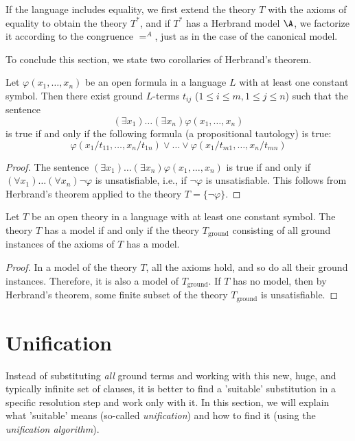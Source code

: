 \begin{remark}
If the language includes equality, we first extend the theory $T$ with the axioms of equality to obtain the theory $T^*$, and if $T^*$ has a Herbrand model $\A$, we factorize it according to the congruence $=^A$, just as in the case of the canonical model.
\end{remark}

To conclude this section, we state two corollaries of Herbrand's theorem.

\begin{corollary}
    Let $\varphi(x_1,\dots,x_n)$ be an open formula in a language $L$ with at least one constant symbol. Then there exist ground $L$-terms $t_{ij}$ ($1\leq i\leq m,1\leq j\leq n$) such that the sentence 
    $$
    (\exists x_1)\dots(\exists x_n)\varphi(x_1,\dots,x_n)$$ 
    is true if and only if the following formula (a propositional tautology) is true:
    $$
    \varphi(x_1/t_{11},\dots,x_n/t_{1n})\lor \dots \lor \varphi(x_1/t_{m1},\dots,x_n/t_{mn})
    $$
\end{corollary}
\begin{proof}
The sentence $(\exists x_1)\dots(\exists x_n)\varphi(x_1,\dots,x_n)$ is true if and only if $(\forall x_1)\dots(\forall x_n)\neg\varphi$ is unsatisfiable, i.e., if $\neg\varphi$ is unsatisfiable. This follows from Herbrand's theorem applied to the theory $T=\{\neg\varphi\}$.
\end{proof}

\begin{corollary}\label{corollary:herbrands-theorem-corollary-ground}
    Let $T$ be an open theory in a language with at least one constant symbol. The theory $T$ has a model if and only if the theory $T_\text{ground}$ consisting of all ground instances of the axioms of $T$ has a model.
\end{corollary}
\begin{proof}
In a model of the theory $T$, all the axioms hold, and so do all their ground instances. Therefore, it is also a model of $T_\text{ground}$. If $T$ has no model, then by Herbrand's theorem, some finite subset of the theory $T_\text{ground}$ is unsatisfiable.
\end{proof}


\section{Unification}\label{section:unification}

Instead of substituting \emph{all} ground terms and working with this new, huge, and typically infinite set of clauses, it is better to find a 'suitable' substitution in a specific resolution step and work only with it. In this section, we will explain what 'suitable' means (so-called \emph{unification}) and how to find it (using the \emph{unification algorithm}).

